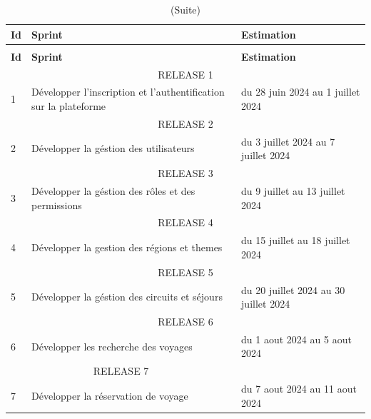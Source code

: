 \documentclass[12pt]{report}
\begin{document}
				\begin{longtable}{|p{1cm}|p{7cm}|p{6cm}|} 
						\caption{Présentation du travail à faire.} 
						\label{tab:TravailAFaire}\\ 
						\hline 
						\textbf{Id} & \textbf{Sprint} & \textbf{Estimation} \\ 
						\hline 
						\endfirsthead 	
						\caption[]{(Suite)}\\ 
						\hline 
						\textbf{Id} & \textbf{Sprint} & \textbf{Estimation} \\ 
						\hline 
						\endhead
						\multicolumn{3}{|c|}{RELEASE 1}\\
						\hline

						1 & Développer l'inscription et l'authentification sur la plateforme & du 28 juin 2024 au 1 juillet 2024\\
						\hline
						\multicolumn{3}{|c|}{RELEASE 2}\\
						
						\hline
						2 & Développer la géstion des utilisateurs & du 3 juillet 2024 au 7 juillet 2024\\

						\hline
						\multicolumn{3}{|c|}{RELEASE 3}\\
												
						\hline
						3 & Développer la géstion des rôles et des permissions & du 9 juillet au 13 juillet 2024\\

						\hline
						\multicolumn{3}{|c|}{RELEASE 4}\\
						
						\hline
						4 &Développer la gestion des régions et themes & du 15 juillet au 18 juillet 2024\\
											
						\hline
						\multicolumn{3}{|c|}{RELEASE 5}\\
						\hline
						5 & Développer la géstion des circuits et séjours & du 20 juillet 2024 au 30 juillet 2024\\

						\hline
						\multicolumn{3}{|c|}{RELEASE 6}\\
						\hline
						6 & Développer les recherche des voyages & du 1 aout 2024 au 5 aout 2024\\

						\hline
						\multicolumn{2}{|c|}{RELEASE 7}\\
						\hline
						7 & Développer la réservation de voyage & du 7 aout 2024 au 11 aout 2024\\
						

\end{longtable}
\end{document}
